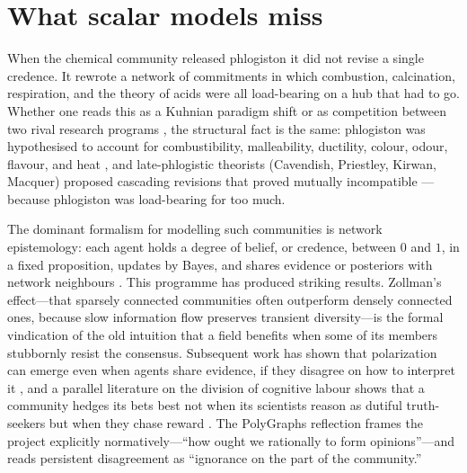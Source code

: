 %

\section{What scalar models miss}
\label{sec:background}

When the chemical community released phlogiston it did not revise a single
credence. It rewrote a network of commitments in which combustion, calcination,
respiration, and the theory of acids were all load-bearing on a hub that had
to go. Whether one reads this as a Kuhnian paradigm shift \citep{kuhn1962} or
as competition between two rival research programs \citep{holmes2000}, the
structural fact is the same: phlogiston was hypothesised to account for
combustibility, malleability, ductility, colour, odour, flavour, and heat
\citep{boantza2017}, and late-phlogistic theorists (Cavendish, Priestley,
Kirwan, Macquer) proposed cascading revisions that proved mutually
incompatible \citep{blumenthal2017}---because phlogiston was load-bearing for
too much.

The dominant formalism for modelling such communities is network epistemology:
each agent holds a degree of belief, or credence, between $0$ and $1$, in a
fixed proposition, updates by Bayes, and shares evidence or posteriors with
network neighbours \citep{zollman2010,oconnor2019,polygraphs2024}. This
programme has produced striking results. Zollman's effect---that sparsely
connected communities often outperform densely connected ones, because slow
information flow preserves transient diversity---is the formal vindication of
the old intuition that a field benefits when some of its members stubbornly
resist the consensus. Subsequent work has shown that polarization can emerge
even when agents share evidence, if they disagree on how to interpret it
\citep{michelini2023}, and a parallel literature on the division of cognitive
labour shows that a community hedges its bets best not when its scientists
reason as dutiful truth-seekers but when they chase reward
\citep{kitcher1990,strevens2003}. The PolyGraphs reflection
\citep{polygraphs2024} frames the project explicitly normatively---``how ought
we rationally to form opinions''---and reads persistent disagreement as
``ignorance on the part of the community.''

